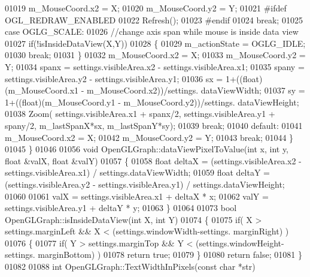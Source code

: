 \begin{DoxyCode}
{{{{{{{{{01019         m_MouseCoord.x2 = X;
01020         m_MouseCoord.y2 = Y;
01021 \textcolor{preprocessor}{#ifdef OGL\_REDRAW\_ENABLED}
01022         Refresh();
01023 \textcolor{preprocessor}{#endif}
01024         \textcolor{keywordflow}{break};
01025     \textcolor{keywordflow}{case} OGLG_SCALE:
01026         \textcolor{comment}{//change axis span while mouse is inside data view}
01027         \textcolor{keywordflow}{if}(!isInsideDataView(X,Y))
01028         \{
01029             m_actionState = OGLG_IDLE;
01030             \textcolor{keywordflow}{break};
01031         \}
01032         m_MouseCoord.x2 = X;
01033         m_MouseCoord.y2 = Y;
01034         spanx = settings.visibleArea.x2 - settings.visibleArea.x1;
01035         spany = settings.visibleArea.y2 - settings.visibleArea.y1;
01036         sx = 1+((float)(m_MouseCoord.x1 - m_MouseCoord.x2))/settings.
      dataViewWidth;
01037         sy = 1+((\textcolor{keywordtype}{float})(m_MouseCoord.y1 - m_MouseCoord.y2))/settings.
      dataViewHeight;
01038         Zoom( settings.visibleArea.x1 + spanx/2, settings.visibleArea.y1 + spany/2, 
      m_lastSpanX*sx, m_lastSpanY*sy);
01039         \textcolor{keywordflow}{break};
01040     \textcolor{keywordflow}{default}:
01041         m_MouseCoord.x2 = X;
01042         m_MouseCoord.y2 = Y;
01043         \textcolor{keywordflow}{break};
01044     \}
01045 \}
01046 
01056 \textcolor{keywordtype}{void} OpenGLGraph::dataViewPixelToValue(\textcolor{keywordtype}{int} x, \textcolor{keywordtype}{int} y, \textcolor{keywordtype}{float} &valX, \textcolor{keywordtype}{float} &valY)
01057 \{
01058     \textcolor{keywordtype}{float} deltaX = (settings.visibleArea.x2 - settings.visibleArea.x1) / 
      settings.dataViewWidth;
01059     \textcolor{keywordtype}{float} deltaY = (settings.visibleArea.y2 - settings.visibleArea.y1) / 
      settings.dataViewHeight;
01060 
01061     valX = settings.visibleArea.x1 + deltaX * x;
01062     valY = settings.visibleArea.y1 + deltaY * y;
01063 \}
01064 
01073 \textcolor{keywordtype}{bool} OpenGLGraph::isInsideDataView(\textcolor{keywordtype}{int} X, \textcolor{keywordtype}{int} Y)
01074 \{
01075     \textcolor{keywordflow}{if}( X > settings.marginLeft && X < (settings.windowWidth-settings.
      marginRight) )
01076     \{
01077         \textcolor{keywordflow}{if}( Y > settings.marginTop && Y < (settings.windowHeight-settings.
      marginBottom) )
01078             \textcolor{keywordflow}{return} \textcolor{keyword}{true};
01079     \}
01080     \textcolor{keywordflow}{return} \textcolor{keyword}{false};
01081 \}
01082 
01088 \textcolor{keywordtype}{int} OpenGLGraph::TextWidthInPixels(\textcolor{keyword}{const} \textcolor{keywordtype}{char} *str)
}}}}}}}}}
\end{DoxyCode}
